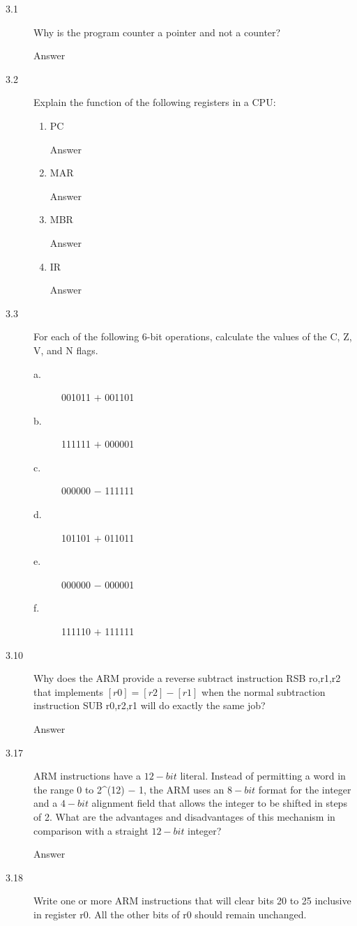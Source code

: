 \documentclass[letterpaper,10pt,titlepage]{article}
\begin{document}
\begin{description}
    \item[3.1] Why is the program counter a pointer and not a counter?
    
    Answer
    \item[3.2] Explain the function of the following registers in a CPU:
    \begin{enumerate}
        \item PC
        
        Answer
        \item MAR
        
        Answer
        \item MBR
        
        Answer
        \item IR
        
        Answer
    \end{enumerate}
    \item[3.3] For each of the following 6-bit operations, calculate the values of the C, Z, V, and N flags.
    \begin{description}
        \item[a.] 001011 $+$ 001101
        \item[b.] 111111 $+$ 000001
        \item[c.] 000000 $-$ 111111
        \item[d.] 101101 $+$ 011011
        \item[e.] 000000 $-$ 000001
        \item[f.] 111110 $+$ 111111
    \end{description}
    \item[3.10] Why does the ARM provide a reverse subtract instruction RSB ro,r1,r2 that implements $[r0] = [r2] - [r1]$ when the normal subtraction instruction SUB r0,r2,r1 will do exactly the same job?
    
    Answer
    \item[3.17] ARM instructions have a $12-bit$ literal. Instead of permitting a word in the range 0 to 2^(12) $-$ 1, the ARM uses an $8-bit$ format for the integer and a $4-bit$ alignment field that allows the integer to be shifted in steps of 2. What are the advantages and disadvantages of this mechanism in comparison with a straight $12-bit$ integer?
    
    Answer
    \item[3.18] Write one or more ARM instructions that will clear bits 20 to 25 inclusive in register r0. All the other bits of r0 should remain unchanged.
    

\end{description}
\end{document}
